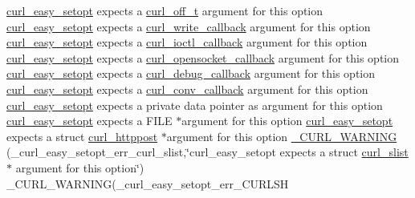 \begin{DoxyCompactItemize}
\hyperlink{easy_8h_a7b171739b7bb728b3b58b2e6ec454aa0}{curl\+\_\+easy\+\_\+setopt} expects a \hyperlink{curlbuild_8h_a494e2b4279dc064f7ed1d0abd602b28d}{curl\+\_\+off\+\_\+t} argument for this option \hyperlink{easy_8h_a7b171739b7bb728b3b58b2e6ec454aa0}{curl\+\_\+easy\+\_\+setopt} expects a \hyperlink{curl_8h_ad65e62dcde45b356254b0f25f38dd802}{curl\+\_\+write\+\_\+callback} argument for this option \hyperlink{easy_8h_a7b171739b7bb728b3b58b2e6ec454aa0}{curl\+\_\+easy\+\_\+setopt} expects a \hyperlink{curl_8h_ae0524f6ec082005e39eb275c71c59a3b}{curl\+\_\+ioctl\+\_\+callback} argument for this option \hyperlink{easy_8h_a7b171739b7bb728b3b58b2e6ec454aa0}{curl\+\_\+easy\+\_\+setopt} expects a \hyperlink{curl_8h_a1b8b8f3e1a4e538a6bb1dd83a3388547}{curl\+\_\+opensocket\+\_\+callback} argument for this option \hyperlink{easy_8h_a7b171739b7bb728b3b58b2e6ec454aa0}{curl\+\_\+easy\+\_\+setopt} expects a \hyperlink{curl_8h_a50147c55283ee1fa3322b0d5aff2326c}{curl\+\_\+debug\+\_\+callback} argument for this option \hyperlink{easy_8h_a7b171739b7bb728b3b58b2e6ec454aa0}{curl\+\_\+easy\+\_\+setopt} expects a \hyperlink{curl_8h_acb230bf6dbf7bcb6e4e8740ea42ca3b3}{curl\+\_\+conv\+\_\+callback} argument for this option \hyperlink{easy_8h_a7b171739b7bb728b3b58b2e6ec454aa0}{curl\+\_\+easy\+\_\+setopt} expects a private data pointer as argument for this option \hyperlink{easy_8h_a7b171739b7bb728b3b58b2e6ec454aa0}{curl\+\_\+easy\+\_\+setopt} expects a F\+I\+LE $\ast$argument for this option \hyperlink{easy_8h_a7b171739b7bb728b3b58b2e6ec454aa0}{curl\+\_\+easy\+\_\+setopt} expects a struct \hyperlink{structcurl__httppost}{curl\+\_\+httppost} $\ast$argument for this option \hyperlink{typecheck-gcc_8h_a41371b428503baed0e38186cb78e4b7a}{\+\_\+\+C\+U\+R\+L\+\_\+\+W\+A\+R\+N\+I\+NG} (\+\_\+curl\+\_\+easy\+\_\+setopt\+\_\+err\+\_\+curl\+\_\+slist,\char`\"{}curl\+\_\+easy\+\_\+setopt expects a struct \hyperlink{structcurl__slist}{curl\+\_\+slist}$\ast$ argument for this option\char`\"{}) \+\_\+\+C\+U\+R\+L\+\_\+\+W\+A\+R\+N\+I\+NG(\+\_\+curl\+\_\+easy\+\_\+setopt\+\_\+err\+\_\+\+C\+U\+R\+L\+SH
\item 

\end{DoxyCompactItemize}
